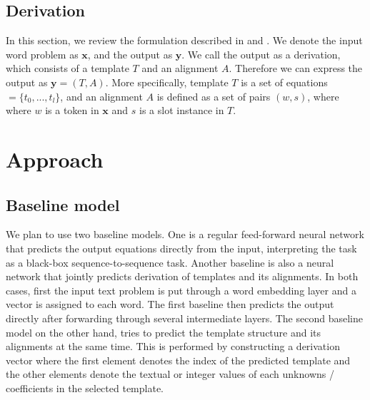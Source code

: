 \documentclass[11pt,letterpaper]{article}
\begin{document}
\subsection{Derivation}
In this section, we review the formulation described in \cite{Kushman2014LearningTA} and \cite{UpChChYi16}. We denote the input word problem as $\textbf{x}$, and the output as $\textbf{y}$. We call the output as a derivation, which consists of a template $T$ and an alignment $A$. Therefore we can express the output as $\textbf{y} = (T, A)$. More specifically, template $T$ is a set of equations $= \{t_0, ..., t_l\}$, and an alignment $A$ is defined as a set of pairs $(w, s)$, where where $w$ is a token in $\textbf{x}$ and $s$ is a slot instance in $T$.
\section{Approach}
\subsection{Baseline model}
We plan to use two baseline models. One is a regular feed-forward neural network that predicts the output equations directly from the input, interpreting the task as a black-box sequence-to-sequence task. Another baseline is also a neural network that jointly predicts derivation of templates and its alignments. In both cases, first the input text problem is put through a word embedding layer and a vector is assigned to each word. The first baseline then predicts the output directly after forwarding through several intermediate layers. The second baseline model on the other hand, tries to predict the template structure and its alignments at the same time. This is performed by constructing a derivation vector where the first element denotes the index of the predicted template and the other elements denote the textual or integer values of each unknowns / coefficients in the selected template.
\end{document}
